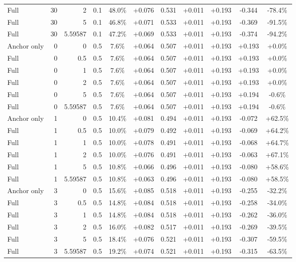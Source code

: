 \begin{table}[htbp]
\begin{tabular}{lrrrccccccc}
Full & 30 & 2 & 0.1 & 48.0\% & +0.076 & 0.531 & +0.011 & +0.193 & -0.344 & -78.4\% \\
Full & 30 & 5 & 0.1 & 46.8\% & +0.071 & 0.533 & +0.011 & +0.193 & -0.369 & -91.5\% \\
Full & 30 & 5.59587 & 0.1 & 47.2\% & +0.069 & 0.533 & +0.011 & +0.193 & -0.374 & -94.2\% \\
Anchor only & 0 & 0 & 0.5 & 7.6\% & +0.064 & 0.507 & +0.011 & +0.193 & +0.193 & +0.0\% \\
Full & 0 & 0.5 & 0.5 & 7.6\% & +0.064 & 0.507 & +0.011 & +0.193 & +0.193 & +0.0\% \\
Full & 0 & 1 & 0.5 & 7.6\% & +0.064 & 0.507 & +0.011 & +0.193 & +0.193 & +0.0\% \\
Full & 0 & 2 & 0.5 & 7.6\% & +0.064 & 0.507 & +0.011 & +0.193 & +0.193 & +0.0\% \\
Full & 0 & 5 & 0.5 & 7.6\% & +0.064 & 0.507 & +0.011 & +0.193 & +0.194 & -0.6\% \\
Full & 0 & 5.59587 & 0.5 & 7.6\% & +0.064 & 0.507 & +0.011 & +0.193 & +0.194 & -0.6\% \\
Anchor only & 1 & 0 & 0.5 & 10.4\% & +0.081 & 0.494 & +0.011 & +0.193 & -0.072 & +62.5\% \\
Full & 1 & 0.5 & 0.5 & 10.0\% & +0.079 & 0.492 & +0.011 & +0.193 & -0.069 & +64.2\% \\
Full & 1 & 1 & 0.5 & 10.0\% & +0.078 & 0.491 & +0.011 & +0.193 & -0.068 & +64.7\% \\
Full & 1 & 2 & 0.5 & 10.0\% & +0.076 & 0.491 & +0.011 & +0.193 & -0.063 & +67.1\% \\
Full & 1 & 5 & 0.5 & 10.8\% & +0.066 & 0.496 & +0.011 & +0.193 & -0.080 & +58.6\% \\
Full & 1 & 5.59587 & 0.5 & 10.8\% & +0.063 & 0.496 & +0.011 & +0.193 & -0.080 & +58.5\% \\
Anchor only & 3 & 0 & 0.5 & 15.6\% & +0.085 & 0.518 & +0.011 & +0.193 & -0.255 & -32.2\% \\
Full & 3 & 0.5 & 0.5 & 14.8\% & +0.084 & 0.518 & +0.011 & +0.193 & -0.258 & -34.0\% \\
Full & 3 & 1 & 0.5 & 14.8\% & +0.084 & 0.518 & +0.011 & +0.193 & -0.262 & -36.0\% \\
Full & 3 & 2 & 0.5 & 16.0\% & +0.082 & 0.517 & +0.011 & +0.193 & -0.269 & -39.5\% \\
Full & 3 & 5 & 0.5 & 18.4\% & +0.076 & 0.521 & +0.011 & +0.193 & -0.307 & -59.5\% \\
Full & 3 & 5.59587 & 0.5 & 19.2\% & +0.074 & 0.521 & +0.011 & +0.193 & -0.315 & -63.5\% \\

\end{tabular}
\end{table}
